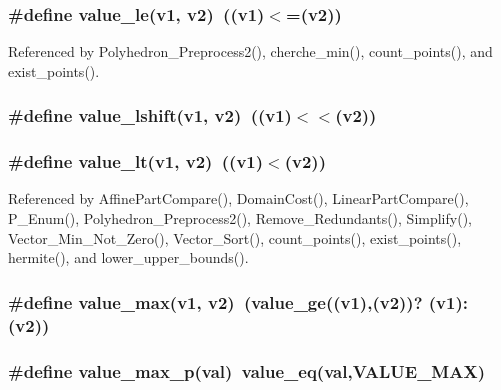 \subsubsection{\setlength{\rightskip}{0pt plus 5cm}\#define value\_\-le(v1, v2)\ ((v1)$<$=(v2))}\label{arithmetique_8h_a27}




Referenced by Polyhedron\_\-Preprocess2(), cherche\_\-min(), count\_\-points(), and exist\_\-points().

\subsubsection{\setlength{\rightskip}{0pt plus 5cm}\#define value\_\-lshift(v1, v2)\ ((v1)$<$$<$(v2))}\label{arithmetique_8h_a41}


\subsubsection{\setlength{\rightskip}{0pt plus 5cm}\#define value\_\-lt(v1, v2)\ ((v1)$<$(v2))}\label{arithmetique_8h_a26}




Referenced by Affine\-Part\-Compare(), Domain\-Cost(), Linear\-Part\-Compare(), P\_\-Enum(), Polyhedron\_\-Preprocess2(), Remove\_\-Redundants(), Simplify(), Vector\_\-Min\_\-Not\_\-Zero(), Vector\_\-Sort(), count\_\-points(), exist\_\-points(), hermite(), and lower\_\-upper\_\-bounds().

\subsubsection{\setlength{\rightskip}{0pt plus 5cm}\#define value\_\-max(v1, v2)\ (value\_\-ge((v1),(v2))? (v1): (v2))}\label{arithmetique_8h_a38}


\subsubsection{\setlength{\rightskip}{0pt plus 5cm}\#define value\_\-max\_\-p(val)\ value\_\-eq(val,VALUE\_\-MAX)}\label{arithmetique_8h_a74}



